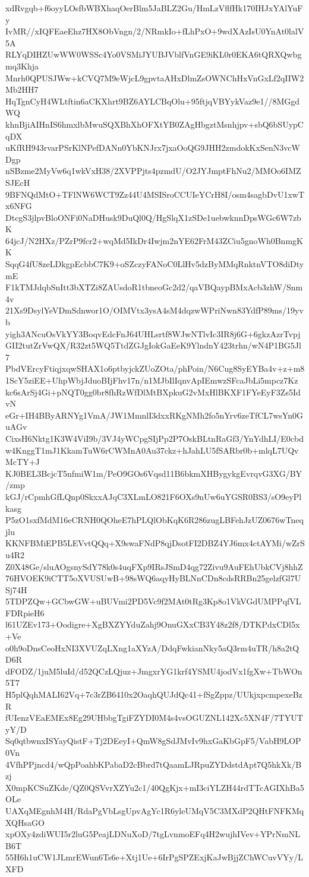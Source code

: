 xdRvgqb+f6oyyLOsfbWBXhaqOerBlm5JaBLZ2Gu/HmLzVflfHk170IHJxYAlYuFy
IvMR//xIQFEaeEhz7HX8ObVngn/2/NRmkIo+fLhPxO+9wdXAzIsU0YnAt0lalV5A
RLYqDIHZUwWW0WSSc4Yo0VSMiJYUBJVblfVnGE9iKL0r0EKA6tQRXQwbgmq3Khja
Mnrh0QPUSJWw+kCVQ7M9eWjcL9gpvtaAHxDlmZsOWNChHxVnGxLf2qIIW2Mb2HH7
HqTgnCyH4WLtftin6aCKXhrt9BZ6AYLCBqOlu+95ftjqVBYykVaz9e1//8MGgdWQ
khnBjiAIHnIS6hmxlbMwuSQXBhXhOFXtYB0ZAgHbgztMsnhjpv+sbQ6bSUypCqDX
uKfRH943rvarPSrKlNPefDANn0YbKNJrx7jxaOoQG9JHH2zmdokKxSenN3vcWDgp
nSBzme2MyVw6q1wkVxH38/2XVPPjts4pzmdU/O2JYJmptFhNu2/MMOo6IMZSJEcH
9BFNQdMtO+TFlNW6WCT9Zz44U4MSISroCCUIeYCrH8I/osm4sagbDvU1xwTx6NFG
DtcgS3jlpvBloONFi0NaDHusk9DuQl0Q/HgSlqX1zSDe1uebwknnDpsWGc6W7zbK
64jcJ/N2HXz/PZrP9fcr2+wqMd5IkDr4Iwjm2nYE62FrM43ZCiu5gnoWh0BnmgKK
SqqG4fU8zeLDkgpEcbbC7K9+oSZczyFANoC0LlHv5dzByMMqRnktnVTO8diDtymE
F1kTMJdqbSnItt3bXTZi8ZAUsdoR1tbneoGc2d2/qaVBQaypBMxAcb3zhW/Snm4v
21Xs9DsylYeVDmSdnwor1O/OIMVtx3ysA4sM4dqzwWPriNwn83YdfP89ms/19yvb
yigh3ANcuOsVkYY3BoqvEdcFnJ64UHLsrtf8WJwNTlvIc3IR8j6G+6gkzAzrTvpj
GII2tutZrVwQX/R32zt5WQ5TtdZGJgIokGaEeK9YlndnY423trhn/wN4P1BG5Jl7
PbdVErcyFtiqjxqwSHAX1o6ptbyjckZUoZOta/phPoin/N6Cug8SyEYBa4v+z+m8
1ScY5ziEE+UhpWbjJduoBIjFhv17n/n1MJbIlIqnvApIEmwzSFcaJbLi5mpcz7Kz
kc6sArSj4Gi+pNQT0gg0br8fhRzWfDlMtBXpkuG2vMxHlBKXF1FYeEyF3Zs5IdvN
eGr+IH4BByARNYg1VmA/JW1MmnlI3dxxRKgNMh2fo5nYrv6zeTfCL7wsYn0GuAGv
CixsH6Nktg1K3W4ViI9b/3VJ4yWCpgSIjPp2P7OskBLtnRaGf3/YnYdhLI/E0cbd
w4KnggT1mJ1KkamTuW6rCWMnA0Au37ckz+hJahLU5fSARbr0b+mlqL7UQvMcTY+J
KJ0BEL3BcjcT5nfmiW1m/PeO9GOs6Vqsd11B6bkmXHBygykgEvrqvG3XG/BY/zmp
kGJ/rCpmhGfLQnp0SkxxAJqC3XLmLO821F6OXs9nUw6uYGSR0BS3/sO9eyPlkasg
P5zO1sxfMdM16eCRNH0QOheE7hPLQlObKqK6R286zugLBFehJzUZ0676wTneqjlu
KKNFBMiEPB5LEVvtQQq+X9swaFNdP8qjDsotFI2DBZ4YJ6mx4ctAYMi/wZrSu4R2
Z0X48Ge/sluAOgsnySdY78k0s4uqFXp9IRsJSmD4qg72Zivu9AuFEhUbkCVj8hhZ
76HVOEK9iCTT5oXVUSUwB+98sWQ6aqyHyBLNnCDn8cdsRRBn25gelzfGl7USj74H
5TDPZQw+GCbwGW+uBUVmi2PD5Vc9f2MAt0tRg3Kp8o1VkVGdUMPPqfVLFDRpieH6
l61UZEv173+Oodigre+XgBXZYYduZahj9OnuGXxCB3Y48z2f8/DTKPdxCDl5x+Ve
o0h9oDnsCeoHxNI3XVUZqLXng1aXYzA/DdqFwkianNky5aQ3rm4uTR/h8a2tQD6R
dFODZ/1juM5luId/d52QCzLQjuz+JmgxrYG1krf4YSMU4jodVx1fgXw+TbWOn5T7
H5plQqhMALI62Vq+7c3rZB6410x2OaqhQUJdQc41+fSgZppz/UUkjxpcmpexeBzR
fUIenzVEaEMEx8Eg29UHbbgTgiFZYDI0M4s4vsOGUZNL142Xc5XN4F/7TYUTyY/D
Sq0qtbwnxISYayQistF+Tj2DEeyI+QmW8gSdJMvIv9hxGaKbGpF5/VabH9LOP0Vn
4VfhPPjncd4/wQpPoahbKPabaD2cBbrd7tQaamLJRpuZYDdstdApt7Q5hkXk/Bzj
X0mpKCSuZKde/QZ0QSVvrXZYu2c1/40QgKjx+mI3ciYLZH44rdTTcAGIXhBa5OLe
UAXqMEgnhM4H/RdaPgVbLsgUpvAgYc1R6yleUMqV5C3MXdP2QHtFNFKMqXQHsaGO
xpOXy4zdiWUI5r2luG5PeajLDNuXoD/7tgLvnmoEFq4H2wujhIVev+YPrNmNLB6T
55H6h1uCW1JLmrEWun6Ts6e+Xtj1Ue+6IrPgSPZExjKaJwBjjZChWCuvVYy/LXFD

